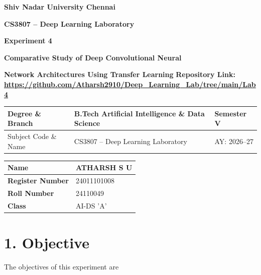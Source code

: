 \documentclass[11pt]{article}
\begin{document}

\begin{center}

{\Large\textbf{Shiv Nadar University Chennai}}

\vspace{3mm}

{\large\textbf{CS3807 -- Deep Learning Laboratory}}

\vspace{3mm}

{\Large\textbf{Experiment 4}}

\vspace{2mm}

{\Large\textbf{Comparative Study of Deep Convolutional Neural}}

{\Large\textbf{Network Architectures Using Transfer Learning}}
\textbf{Repository Link:}
\textbf{\url{https://github.com/Atharsh2910/Deep_Learning_Lab/tree/main/Lab4}
}
\end{center}

\vspace{5mm}

\begin{tabular}{|p{3.8cm}|p{8cm}|p{2cm}|}
\hline
Degree \& Branch & B.Tech Artificial Intelligence \& Data Science & Semester V\\ \hline
Subject Code \& Name & CS3807 -- Deep Learning Laboratory & AY: 2026--27\\ \hline
\end{tabular}

\begin{tabular}{|p{3.5cm}|p{8cm}|}
\hline
\textbf{Name} & {ATHARSH S U}\\ \hline
\textbf{Register Number} &{24011101008} \\ \hline
\textbf{Roll Number} &{24110049} \\ \hline
\textbf{Class} & {AI-DS 'A'}\\ \hline
\end{tabular}
\vspace{3mm}


\section*{1. Objective}

The objectives of this experiment are
\end{document}
